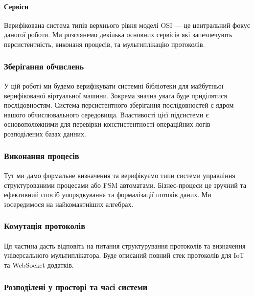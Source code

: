 \documentclass[11pt,oneside]{article}
\begin{document}
   \paragraph{\bf Сервіси}
   Верифікована система типів верхнього рівня моделі OSI --- це центральний фокус даногої роботи.
   Ми розглянемо декілька основних сервісів які запезпечують персистентність, виконаня процесів,
   та мультиплікацію протоколів.

   \newpage

\subsubsection{Зберігання обчислень}
   \paragraph{}
   У цій роботі ми будемо верифікувати системні бібліотеки для
   майбутньої верифікованої віртуальної машини. Зокрема значна увага буде приділятися
   послідовностям. Система персистентного зберігання послідовностей є ядром нашого
   обчислювального середовища. Властивості цієї підсистеми є основоположними
   для перевірки констистентності операційних логів розподілених базах данних.


\subsubsection{Виконання процесів}
   \paragraph{}
   Тут ми дамо формальне визначення та верифікуємо
   типи системи управління структурованими процесами або FSM автоматами.
   Бізнес-процеси це зручний та ефективний спосіб упорядкування та формалізації
   потоків даних. Ми зосередимося на найкомактніших алгебрах.

\subsubsection{Комутація протоколів}
   \paragraph{}
   Ця частина дасть відповіть на питання структурування
   протоколів та визначення універсального мультиплікатора. Буде описаний повний стек
   протоколів для IoT та WebSocket додатків.

\subsubsection{Розподілені у просторі та часі системи}
\end{document}
